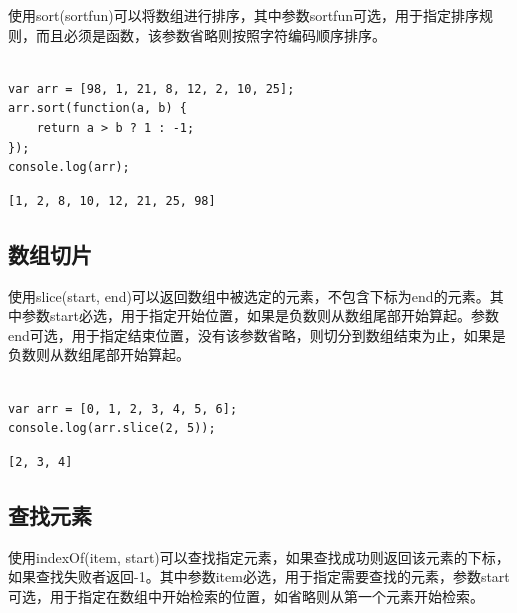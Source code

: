 使用sort(sortfun)可以将数组进行排序，其中参数sortfun可选，用于指定排序规则，而且必须是函数，该参数省略则按照字符编码顺序排序。\\

\\

\begin{lstlisting}[style=htmlcssjs]
var arr = [98, 1, 21, 8, 12, 2, 10, 25];
arr.sort(function(a, b) {
    return a > b ? 1 : -1;
});
console.log(arr);
\end{lstlisting}

\begin{tcolorbox}
	\begin{verbatim}
[1, 2, 8, 10, 12, 21, 25, 98]
	\end{verbatim}
\end{tcolorbox}

\vspace{0.5cm}

\subsection{数组切片}

使用slice(start, end)可以返回数组中被选定的元素，不包含下标为end的元素。其中参数start必选，用于指定开始位置，如果是负数则从数组尾部开始算起。参数end可选，用于指定结束位置，没有该参数省略，则切分到数组结束为止，如果是负数则从数组尾部开始算起。\\

\\

\begin{lstlisting}[style=htmlcssjs]
var arr = [0, 1, 2, 3, 4, 5, 6];
console.log(arr.slice(2, 5));
\end{lstlisting}

\begin{tcolorbox}
	\begin{verbatim}
[2, 3, 4]
	\end{verbatim}
\end{tcolorbox}

\vspace{0.5cm}

\subsection{查找元素}

使用indexOf(item, start)可以查找指定元素，如果查找成功则返回该元素的下标，如果查找失败者返回-1。其中参数item必选，用于指定需要查找的元素，参数start可选，用于指定在数组中开始检索的位置，如省略则从第一个元素开始检索。\\

